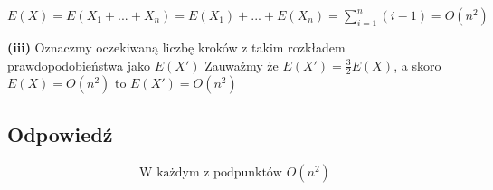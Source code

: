 \(E(X) = E(X_1 + ... + X_n) = E(X_1) + ...+E(X_n) = \sum_{i = 1}^n (i-1) = O(n^2)\)


\textbf{(iii)} Oznaczmy oczekiwaną liczbę kroków z takim rozkładem prawdopodobieństwa jako \(E(X')\) Zauważmy że \(E(X') = \frac{3}{2}E(X)\), a skoro \(E(X) = O(n^2)\) to \(E(X') = O(n^2)\)
\subsection*{Odpowiedź}
\[
	\boxed{\text{W każdym z podpunktów } O(n^2)}
\]
